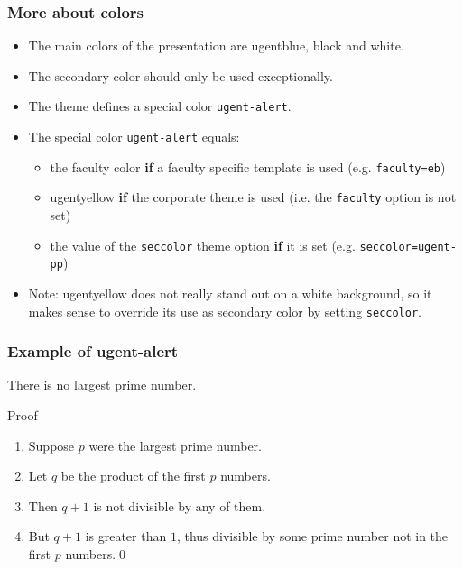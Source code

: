 \documentclass[aspectratio=169]{beamer}
\begin{document}
\begin{frame}
    \frametitle{More about colors}
    \begin{itemize}
        \itemsep.25cm
        \item The main colors of the presentation are ugentblue, black and white.
        \item The secondary color should only be used exceptionally.
        \item The theme defines a special color \texttt{ugent-alert}.
        \item The special color \texttt{ugent-alert} equals:
            \begin{itemize}
                \itemsep.15cm
                \item the faculty color \textbf{if} a faculty specific template is used (e.g. \texttt{faculty=eb})
                \item  {\color{ugentyellow}ugentyellow} \textbf{if} the corporate theme is used (i.e. the \texttt{faculty} option is not set)
                \item the value of the \texttt{seccolor} theme option \textbf{if} it is set (e.g. \texttt{seccolor=ugent-pp})
            \end{itemize}
        \item Note: {\color{ugentyellow}ugentyellow} does not really stand out on a white background, so it makes sense to override its use as secondary color by setting \texttt{seccolor}.
    \end{itemize}
\end{frame}

\begin{frame}
    \frametitle{Example of ugent-alert}
    \begin{theorem}
        There is no largest prime number.
    \end{theorem} 
    \pause
    \begin{block}{Proof}
        \begin{enumerate} 
            \item<2-| alert@2> Suppose $p$ were the largest prime number. 
            \item<3-| alert@3> Let $q$ be the product of the first $p$ numbers. 
            \item<4-| alert@4> Then $q+1$ is not divisible by any of them. 
            \item<5-6| alert@5> But $q + 1$ is greater than $1$, thus divisible by some prime number not in the first $p$ numbers.\qed
        \end{enumerate}
    \end{block}
\end{frame}
\end{document}
